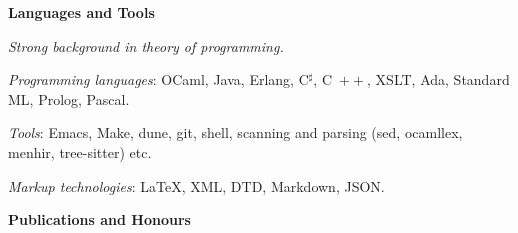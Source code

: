 \documentclass[a4paper,11pt]{article}
\newcommand{\cpp}{\mbox{C \hspace*{-2.5mm} \raise 0.7mm \hbox{${\scriptscriptstyle ++}$}}}
\begin{document}
\bigskip
\noindent\textbf{\large Languages and Tools}
\medskip
\begin{itemize*}

  \item \textit{Strong background in theory of programming.}

  \item \textit{Programming languages}: OCaml, Java, Erlang,
    C$^\sharp$, \cpp, XSLT, Ada, Standard ML, Prolog, Pascal.

  \item \textit{Tools}: Emacs, Make, dune, git, shell, scanning and
    parsing (sed, ocamllex, menhir, tree-sitter) etc.

  \item \textit{Markup technologies}: \LaTeX, XML, DTD, Markdown,
    JSON.







\end{itemize*}

\bigskip
\noindent\textbf{\large Publications and Honours}

\bigskip
\end{document}
